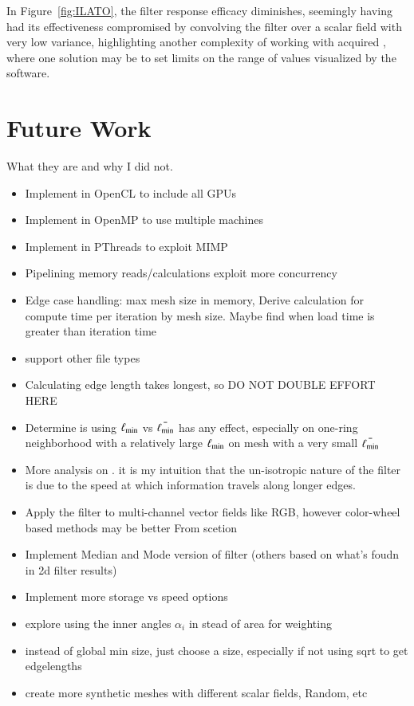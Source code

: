 In Figure~\ref{fig:ILATO}, the filter response efficacy diminishes,  seemingly having had its effectiveness compromised by convolving the filter over a scalar field with very low variance, highlighting another complexity of working with acquired \tdd{}, where one solution may be to set limits on the range of values visualized by the software.


%
%
%
%
%
%
\section{Future Work}
What they are and why I did not.
\begin{itemize}
	\item Implement in OpenCL to include all GPUs
	\item Implement in OpenMP to use multiple machines
	\item Implement in PThreads to exploit MIMP
	\item Pipelining memory reads/calculations exploit more concurrency
	\item Edge case handling: max mesh size in memory, Derive calculation for compute time per iteration by mesh size. Maybe find when load time is greater than iteration time
	\item support other file types
	\item Calculating edge length takes longest, so DO NOT DOUBLE EFFORT HERE
	\item Determine is using $\ell_\text{min}$ vs $\bar{\ell_\text{min}}$ has any effect, especially on one-ring neighborhood with a relatively large $\ell_\text{min}$ on mesh with a very small $\bar{\ell_\text{min}}$
	\item More analysis on \fors. it is my intuition that the un-isotropic nature of the filter is due to the speed at which information travels along longer edges.
	\item Apply the filter to multi-channel vector fields like RGB, however color-wheel based methods may be better From scetion
\label{ch2sTDDssFV}
	\item Implement Median and Mode version of filter (others based on what's foudn in 2d filter results)
	\item Implement more storage vs speed options
	\item explore using the inner angles $\alpha_i$ in stead of area for weighting
	\item instead of global min size, just choose a size, especially if not using sqrt to get edgelengths
	\item create more synthetic meshes with different scalar fields, Random, etc

\end{itemize}
